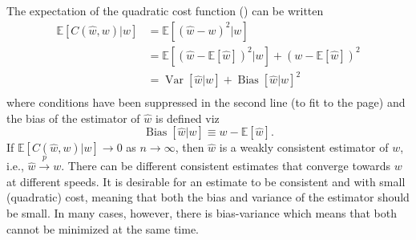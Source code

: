 \begin{theorem}
	\label{theorem:MSE}
	The expectation of the quadratic cost function () can be written
	\begin{equation}
		\begin{split}
			\mathbb{E}[C(\hat{w}, w)|w] &= \mathbb{E}[(\hat{w}-w)^2|w]\\ 
			&= \mathbb{E}[(\hat{w}-\mathbb{E}[\hat{w}])^2|w]+(w-\mathbb{E}[\hat{w}])^2\\
			&=\operatorname{Var}[\hat{w}|w]+\operatorname{Bias}[\hat{w}|w]^2\\
		\end{split}
		\label{eq:MSE}
	\end{equation}
	where conditions have been suppressed in the second line (to fit to the page) and the bias of the estimator of $\hat{w}$ is defined viz
	\begin{equation}
		\operatorname{Bias}[\hat{w}|w]\equiv w-\mathbb{E}[\hat{w}].
	\end{equation}
	If $\mathbb{E}[C(\hat{w}, w)|w] \to 0$ as $n \to \infty$, then $\hat{w}$ is a weakly consistent estimator of $w$, i.e., $\hat{w} \xrightarrow{p} w$. There can be different consistent estimates that converge towards $w$ at different speeds. It is desirable for an estimate to be consistent and with small (quadratic) cost, meaning that both the bias and variance of the estimator should be small. In many cases, however, there is bias-variance which means that both cannot be minimized at the same time. 
\end{theorem}

